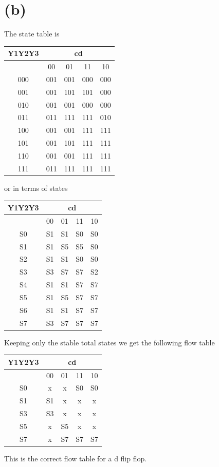 \documentclass[12pt]{article}
\begin{document}
\section*{(b)}
The state table is 
\begin{center}
    \begin{tabular}{|c|c|c|c|c|}
        Y1Y2Y3 & \multicolumn{4}{c}{cd} \\
        \hline
        & 00 & 01 & 11 & 10 \\
        \hline
        000 & 001& 001& 000& 000\\
\hline
001 & 001& 101& 101& 000\\
\hline
010 & 001& 001& 000& 000\\
\hline
011 & 011& 111& 111& 010\\
\hline
100 & 001& 001& 111& 111\\
\hline
101 & 001& 101& 111& 111\\
\hline
110 & 001& 001& 111& 111\\
\hline
111 & 011& 111& 111& 111\\
\hline
    \end{tabular}
\end{center}

or in terms of states
\begin{center}
    \begin{tabular}{|c|c|c|c|c|}
        Y1Y2Y3 & \multicolumn{4}{c}{cd} \\
        \hline
        & 00 & 01 & 11 & 10 \\
        \hline
        S0 & S1& S1& S0& S0\\
        \hline
        S1 & S1& S5& S5& S0\\
        \hline
        S2 & S1& S1& S0& S0\\
        \hline
        S3 & S3& S7& S7& S2\\
        \hline
        S4 & S1& S1& S7& S7\\
        \hline
        S5 & S1& S5& S7& S7\\
        \hline
        S6 & S1& S1& S7& S7\\
        \hline
        S7 & S3& S7& S7& S7\\
        \hline
    \end{tabular}
\end{center}

Keeping only the stable total states we get the following flow table
\begin{center}
    \begin{tabular}{|c|c|c|c|c|}
        Y1Y2Y3 & \multicolumn{4}{c}{cd} \\
        \hline
        & 00 & 01 & 11 & 10 \\
        \hline
        S0 & x& x& S0& S0\\
\hline
S1 & S1& x& x& x\\
\hline
S3 & S3& x& x& x\\
\hline
S5 & x& S5& x& x\\
\hline
S7 & x& S7& S7& S7\\
\hline
    \end{tabular}
\end{center}
This is the correct flow table for a d flip flop.
\end{document}

